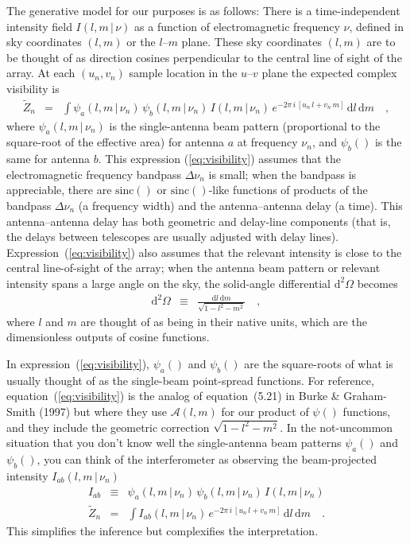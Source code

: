 \documentclass[12pt]{article}
\renewcommand{\exp}[1]{e^{#1}}
\newcommand{\sinc}{\mathrm{sinc}}
\newcommand{\given}{\,|\,}
\newcommand{\expectation}[1]{\tilde{#1}}
\newcommand{\dd}{\mathrm{d}}
\begin{document}
The generative model for our purposes is as follows: There is a
time-independent intensity field $I(l,m\given\nu)$ as a function of
electromagnetic frequency $\nu$, defined in sky coordinates $(l,m)$ or
the $l$--$m$ plane.  These sky coordinates $(l, m)$ are to be thought
of as direction cosines perpendicular to the central line of sight of
the array.  At each $(u_n, v_n)$ sample location in the $u$--$v$ plane
the expected complex visibility is
\begin{eqnarray}
\label{eq:visibility}
\expectation{Z}_n &=& \int \psi_a(l,m\given\nu_n)\,\psi_b(l,m\given\nu_n)\,I(l,m\given\nu_n)
                         \,\exp{-2\pi\,i\,[u_n\,l + v_n\,m]}\,\dd l\,\dd m
\quad ,
\end{eqnarray}
where $\psi_a(l,m\given\nu_n)$ is the single-antenna beam pattern
(proportional to the square-root of the effective area) for antenna
$a$ at frequency $\nu_n$, and $\psi_b()$ is the same for antenna $b$.
This expression (\ref{eq:visibility}) assumes that the electromagnetic
frequency bandpass $\Delta\nu_n$ is small; when the bandpass is
appreciable, there are $\sinc()$ or $\sinc()$-like functions of
products of the bandpass $\Delta\nu_n$ (a frequency width) and the
antenna--antenna delay (a time).  This antenna--antenna delay has both
geometric and delay-line components (that is, the delays between
telescopes are usually adjusted with delay lines).
Expression~(\ref{eq:visibility}) also assumes that the relevant
intensity is close to the central line-of-sight of the array; when the
antenna beam pattern or relevant intensity spans a large angle on the
sky, the solid-angle differential $\dd^2\Omega$ becomes
\begin{eqnarray}
\dd^2\Omega &\equiv& \frac{\dd l\,\dd m}{\sqrt{1-l^2-m^2}}
\quad ,
\end{eqnarray}
where $l$ and $m$ are thought of as being in their native units, which
are the dimensionless outputs of cosine functions.

In expression~(\ref{eq:visibility}), $\psi_a()$ and $\psi_b()$ are the
square-roots of what is usually thought of as the single-beam
point-spread functions.  For reference, equation~(\ref{eq:visibility})
is the analog of equation~(5.21) in Burke \& Graham-Smith (1997) but
where they use $\mathscr{A}(l,m)$ for our product of $\psi()$
functions, and they include the geometric correction
$\sqrt{1-l^2-m^2}$.  In the not-uncommon situation that you don't know
well the single-antenna beam patterns $\psi_a()$ and $\psi_b()$, you
can think of the interferometer as observing the beam-projected
intensity $I_{ab}(l,m\given\nu_n)$
\begin{eqnarray}
I_{ab} &\equiv& \psi_a(l,m\given\nu_n)\,\psi_b(l,m\given\nu_n)\,I(l,m\given\nu_n)
\\
\expectation{Z}_n &=& \int I_{ab}(l,m\given\nu_n)
                         \,\exp{-2\pi\,i\,[u_n\,l + v_n\,m]}\,\dd l\,\dd m
\quad .
\end{eqnarray}
This simplifies the inference but complexifies the interpretation.
\end{document}
